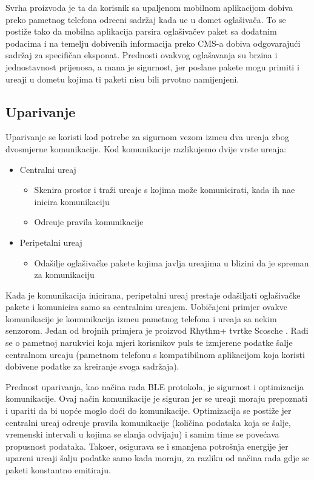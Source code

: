 Svrha proizvoda je ta da korisnik sa upaljenom mobilnom aplikacijom dobiva preko pametnog telefona odre\dj eni sadr\v{z}aj kada u\dj e u domet ogla\v{s}iva\v{c}a. To se posti\v{z}e tako da mobilna aplikacija parsira ogla\v{s}iva\v{c}ev paket sa dodatnim podacima i na temelju dobivenih informacija preko CMS-a dobiva odgovaraju\'{c}i sadr\v{z}aj za specifi\v{c}an eksponat.
Prednosti ovakvog ogla\v{s}avanja su brzina i jednostavnost prijenosa, a mana je sigurnost, jer poslane pakete mogu primiti i ure\dj aji u dometu kojima ti paketi nisu bili prvotno namijenjeni.


\subsection{Uparivanje}
Uparivanje se koristi kod potrebe za sigurnom vezom izme\dj u dva ure\dj aja zbog dvosmjerne komunikacije. Kod komunikacije razlikujemo dvije vrste ure\dj aja:


\begin{itemize}
	\item Centralni ure\dj aj
	\begin{itemize}
		\item Skenira prostor i tra\v{z}i ure\dj aje s kojima mo\v{z}e komunicirati, kada ih na\dj e inicira komunikaciju
		\item Odre\dj uje pravila komunikacije
	\end{itemize}
	\item Peripetalni ure\dj aj
	\begin{itemize}
		\item Oda\v{s}ilje ogla\v{s}iva\v{c}ke pakete kojima javlja ure\dj ajima u blizini da je spreman za komunikaciju
	\end{itemize}
\end{itemize}

Kada je komunikacija inicirana, peripetalni ure\dj aj prestaje oda\v{s}iljati ogla\v{s}iva\v{c}ke pakete i komunicira samo sa centralnim ure\dj ajem. Uobi\v{c}ajeni primjer ovakve komunikacije je komunikacija izme\dj u pametnog telefona i ure\dj aja sa nekim senzorom. Jedan od brojnih primjera je proizvod Rhythm+ tvrtke Scosche \cite{scosche} . Radi se o pametnoj narukvici koja mjeri korisnikov puls te izmjerene podatke \v{s}alje centralnom ure\dj aju (pametnom telefonu s kompatibilnom aplikacijom koja koristi dobivene podatke za kreiranje svoga sadr\v{z}aja).

Prednost uparivanja, kao na\v{c}ina rada BLE protokola, je sigurnost i optimizacija komunikacije. Ovaj na\v{c}in komunikacije je siguran jer se ure\dj aji moraju prepoznati i upariti da bi uop\'{c}e moglo do\'{c}i do komunikacije. Optimizacija se posti\v{z}e jer centralni ure\dj aj odre\dj uje pravila komunikacije (koli\v{c}ina podataka koja se \v{s}alje, vremenski intervali u kojima se slanja odvijaju) i samim time se pove\'{c}ava propusnost podataka. Tako\dj er, osigurava se i smanjena potro\v{s}nja energije jer upareni ure\dj aji \v{s}alju podatke samo kada moraju, za razliku od na\v{c}ina rada gdje se paketi konstantno emitiraju.


